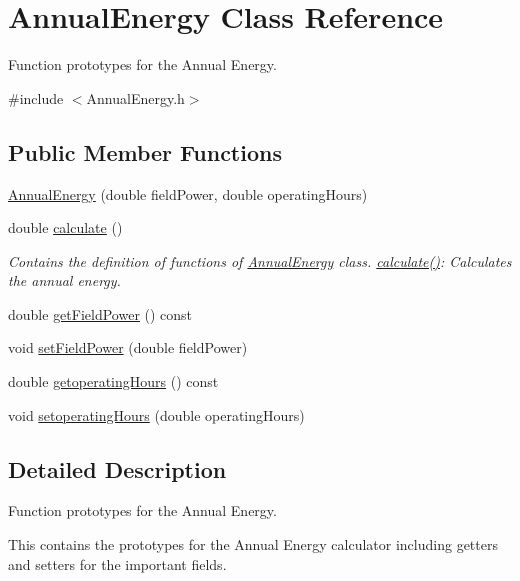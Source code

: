 \hypertarget{class_annual_energy}{}\section{Annual\+Energy Class Reference}
\label{class_annual_energy}


Function prototypes for the Annual Energy.  




{\ttfamily \#include $<$Annual\+Energy.\+h$>$}

\subsection*{Public Member Functions}
\begin{DoxyCompactItemize}
\item 
\hyperlink{class_annual_energy_adb693a67965b0ff46436ee5141ab356d}{Annual\+Energy} (double field\+Power, double operating\+Hours)
\item 
double \hyperlink{class_annual_energy_ab599860ffb32ce20a1042a3e9d2ad57f}{calculate} ()
\begin{DoxyCompactList}\small\item\em Contains the definition of functions of \hyperlink{class_annual_energy}{Annual\+Energy} class. \hyperlink{class_annual_energy_ab599860ffb32ce20a1042a3e9d2ad57f}{calculate()}\+: Calculates the annual energy. \end{DoxyCompactList}\item 
double \hyperlink{class_annual_energy_a52aa52274243f578ea7f92d27707cacb}{get\+Field\+Power} () const
\item 
void \hyperlink{class_annual_energy_a4f7212fcf2f6fcd2b12f36ca26a368a1}{set\+Field\+Power} (double field\+Power)
\item 
double \hyperlink{class_annual_energy_a86a176d57507c7be77d0ead5f794af28}{getoperating\+Hours} () const
\item 
void \hyperlink{class_annual_energy_a803812f06ca88aca8a02601930e870cf}{setoperating\+Hours} (double operating\+Hours)
\end{DoxyCompactItemize}


\subsection{Detailed Description}
Function prototypes for the Annual Energy. 

This contains the prototypes for the Annual Energy calculator including getters and setters for the important fields.


